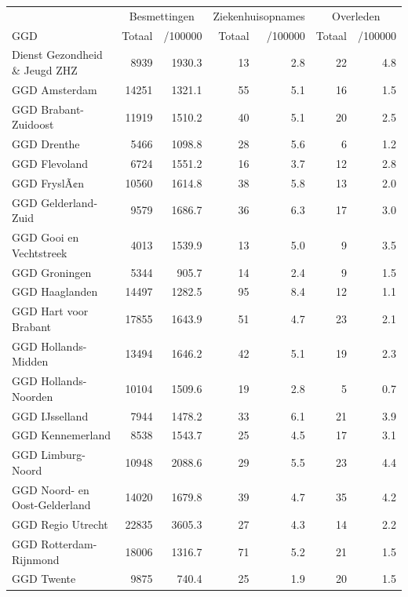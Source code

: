\documentclass[
  english,
  man,floatsintext]{apa6}
\begin{document}
\begin{table}
\centering\begingroup\fontsize{10}{12}\selectfont

\begin{threeparttable}
\begin{tabular}{lrrrrrr}
\toprule
\multicolumn{1}{c}{ } & \multicolumn{2}{c}{Besmettingen} & \multicolumn{2}{c}{Ziekenhuisopnames} & \multicolumn{2}{c}{Overleden} \\
\cmidrule(l{3pt}r{3pt}){2-3} \cmidrule(l{3pt}r{3pt}){4-5} \cmidrule(l{3pt}r{3pt}){6-7}
GGD & Totaal & /100000 & Totaal & /100000 & Totaal & /100000\\
\midrule
Dienst Gezondheid \& Jeugd ZHZ & 8939 & 1930.3 & 13 & 2.8 & 22 & 4.8\\
GGD Amsterdam & 14251 & 1321.1 & 55 & 5.1 & 16 & 1.5\\
GGD Brabant-Zuidoost & 11919 & 1510.2 & 40 & 5.1 & 20 & 2.5\\
GGD Drenthe & 5466 & 1098.8 & 28 & 5.6 & 6 & 1.2\\
GGD Flevoland & 6724 & 1551.2 & 16 & 3.7 & 12 & 2.8\\
GGD FryslÃ¢n & 10560 & 1614.8 & 38 & 5.8 & 13 & 2.0\\
GGD Gelderland-Zuid & 9579 & 1686.7 & 36 & 6.3 & 17 & 3.0\\
GGD Gooi en Vechtstreek & 4013 & 1539.9 & 13 & 5.0 & 9 & 3.5\\
GGD Groningen & 5344 & 905.7 & 14 & 2.4 & 9 & 1.5\\
GGD Haaglanden & 14497 & 1282.5 & 95 & 8.4 & 12 & 1.1\\
GGD Hart voor Brabant & 17855 & 1643.9 & 51 & 4.7 & 23 & 2.1\\
GGD Hollands-Midden & 13494 & 1646.2 & 42 & 5.1 & 19 & 2.3\\
GGD Hollands-Noorden & 10104 & 1509.6 & 19 & 2.8 & 5 & 0.7\\
GGD IJsselland & 7944 & 1478.2 & 33 & 6.1 & 21 & 3.9\\
GGD Kennemerland & 8538 & 1543.7 & 25 & 4.5 & 17 & 3.1\\
GGD Limburg-Noord & 10948 & 2088.6 & 29 & 5.5 & 23 & 4.4\\
GGD Noord- en Oost-Gelderland & 14020 & 1679.8 & 39 & 4.7 & 35 & 4.2\\
GGD Regio Utrecht & 22835 & 3605.3 & 27 & 4.3 & 14 & 2.2\\
GGD Rotterdam-Rijnmond & 18006 & 1316.7 & 71 & 5.2 & 21 & 1.5\\
GGD Twente & 9875 & 740.4 & 25 & 1.9 & 20 & 1.5\\

\end{tabular}
\end{threeparttable}
\end{table}
\end{document}
